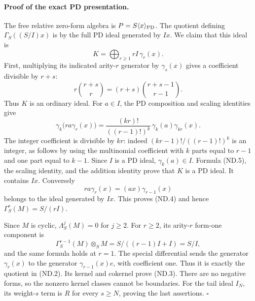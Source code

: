 \paragraph{Proof of the exact PD presentation.}
The free relative zero-form algebra is
\(P=S\langle x\rangle_{\rm PD}\).
The quotient defining \(\Gamma_S((S/I)x)\) is by the full
PD ideal generated by \(I x\). We claim that this ideal is
\[
                 K=\bigoplus_{r\geq1}rI\,\gamma_r(x).
                                                               \tag{ND.4}
\]
First, multiplying its indicated arity-\(r\) generator by
\(\gamma_s(x)\) gives a coefficient divisible by \(r+s\):
\[
 r\binom{r+s}{r}=(r+s)\binom{r+s-1}{r-1}.
\]
Thus \(K\) is an ordinary ideal. For \(a\in I\), the PD
composition and scaling identities give
\[
 \gamma_k\bigl(r a\gamma_r(x)\bigr)
  =\frac{(kr)!}{((r-1)!)^k}\,\gamma_k(a)\gamma_{kr}(x).
                                                               \tag{ND.5}
\]
The integer coefficient is divisible by \(kr\): indeed
\((kr-1)!/((r-1)!)^k\) is an integer, as follows by using
the multinomial coefficient with \(k\) parts equal to \(r-1\)
and one part equal to \(k-1\). Since \(I\) is a PD ideal,
\(\gamma_k(a)\in I\). Formula (ND.5), the scaling identity,
and the addition identity prove that \(K\) is a PD ideal.
It contains \(Ix\). Conversely
\[
                 r a\gamma_r(x)=(a x)\gamma_{r-1}(x)
\]
belongs to the ideal generated by \(Ix\). This proves (ND.4)
and hence \(\Gamma_S^r(M)=S/(rI)\).

Since \(M\) is cyclic, \(\Lambda_S^j(M)=0\) for \(j\geq2\).
For \(r\geq2\), its arity-\(r\) form-one component is
\[
 \Gamma_S^{r-1}(M)\otimes_S M
       =S/((r-1)I+I)=S/I,
\]
and the same formula holds at \(r=1\).
The special differential sends the generator \(\gamma_r(x)\)
to the generator \(\gamma_{r-1}(x)e\), with coefficient one.
Thus it is exactly the quotient in (ND.2).
Its kernel and cokernel prove (ND.3). There are no negative
forms, so the nonzero kernel classes cannot be boundaries.
For the tail ideal \(I_N\), its weight-\(s\) term is \(R\)
for every \(s\geq N\), proving the last assertions.
\(\square\)

